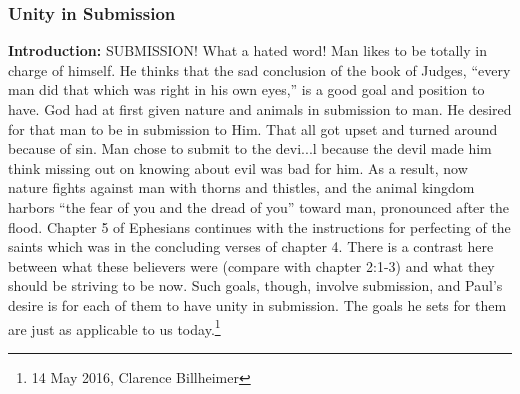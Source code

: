 \subsubsection{Unity in Submission}
\textbf{Introduction:} SUBMISSION! What a hated word! Man likes to be totally in charge of himself. He thinks that the sad conclusion of the book of Judges, “every man did that which was right in his own eyes,” is a good goal and position to have. God had at first given nature and animals in submission to man. He desired for that man to be in submission to Him. That all got upset and turned around because of sin. Man chose to submit to the devi...l because the devil made him think missing out on knowing about evil was bad for him. As a result, now nature fights against man with thorns and thistles, and the animal kingdom harbors “the fear of you and the dread of you” toward man, pronounced after the flood.
Chapter 5 of Ephesians continues with the instructions for perfecting of the saints which was in the concluding verses of chapter 4. There is a contrast here between what these believers were (compare with chapter 2:1-3) and what they should be striving to be now. Such goals, though, involve submission, and Paul’s desire is for each of them to have unity in submission. The goals he sets for them are just as applicable to us today.\footnote{14 May 2016, Clarence Billheimer}
